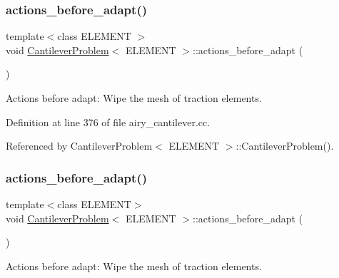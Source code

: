 \subsubsection{\texorpdfstring{actions\+\_\+before\+\_\+adapt()}{actions\_before\_adapt()}\hspace{0.1cm}{\footnotesize\ttfamily [1/2]}}
{\footnotesize\ttfamily template$<$class E\+L\+E\+M\+E\+NT $>$ \\
void \hyperlink{classCantileverProblem}{Cantilever\+Problem}$<$ E\+L\+E\+M\+E\+NT $>$\+::actions\+\_\+before\+\_\+adapt (\begin{DoxyParamCaption}{ }\end{DoxyParamCaption})}



Actions before adapt\+: Wipe the mesh of traction elements. 



Definition at line 376 of file airy\+\_\+cantilever.\+cc.



Referenced by Cantilever\+Problem$<$ E\+L\+E\+M\+E\+N\+T $>$\+::\+Cantilever\+Problem().

\mbox{\label{classCantileverProblem_a50f8964219c507562945655e0ed5fc23}} 
\subsubsection{\texorpdfstring{actions\+\_\+before\+\_\+adapt()}{actions\_before\_adapt()}\hspace{0.1cm}{\footnotesize\ttfamily [2/2]}}
{\footnotesize\ttfamily template$<$class E\+L\+E\+M\+E\+NT$>$ \\
void \hyperlink{classCantileverProblem}{Cantilever\+Problem}$<$ E\+L\+E\+M\+E\+NT $>$\+::actions\+\_\+before\+\_\+adapt (\begin{DoxyParamCaption}{ }\end{DoxyParamCaption})}



Actions before adapt\+: Wipe the mesh of traction elements. 

\mbox{\label{classCantileverProblem_a293902b825898ce043ffce3f0691f5a5}} 
